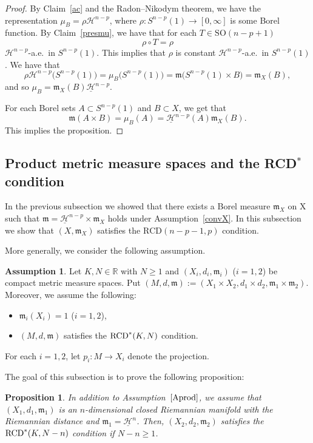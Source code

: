\documentclass[10pt,a4paper]{amsart}
\numberwithin{equation}{section}
\newtheorem{Prop}[Thm]{Proposition}
\theoremstyle{definition}
\newtheorem{Asu}[Thm]{Assumption}
\newcommand{\R}{\mathbb{R}}
\newcommand{\mf}{\mathfrak{m}}
\newcommand{\RCD}{{\rm RCD}^\ast}
\newcommand{\Ha}{\mathcal{H}}
\newcommand{\nHa}{\underline{\mathcal{H}}}
\begin{document}
\begin{proof}
By Claim~\ref{ac} and the Radon--Nikodym theorem, we have the representation $\mu_B=\rho \Ha^{n-p}$, where $\rho\colon S^{n-p}(1)\to [0,\infty]$ is some Borel function.
By Claim~\ref{presmu}, we have that for each $T\in \mathrm{SO}(n-p+1)$
\[
\rho\circ T=\rho
\]
$\Ha^{n-p}$-a.e.\ in $S^{n-p}(1)$.
This implies that $\rho$ is constant $\Ha^{n-p}$-a.e.\ in $S^{n-p}(1)$.
We have that
\[
\rho\Ha^{n-p}\big(S^{n-p}(1)\big)=\mu_B\big(S^{n-p}(1)\big)=\mf\big(S^{n-p}(1)\times B\big)=\mf_X(B),
\]
and so $\mu_B=\mf_X(B)\nHa^{n-p}$.

For each Borel sets $A\subset S^{n-p}(1)$ and $B\subset X$, we get that
\[
\mf(A\times B)=\mu_B(A)=\nHa^{n-p}(A)\mf_X(B).
\tag*{\qed}
\]
\renewcommand{\qed}{}
This implies the proposition.
\end{proof}


\subsection[Product metric measure spaces and the RCD* condition]{Product metric measure spaces and the RCD$\boldsymbol{^*}$ condition}
In the previous subsection we showed that there exists a Borel measure $\mf_X$ on X such that $\mf=\nHa^{n-p}\times \mf_X$ holds under Assumption~\ref{convX}.
In this subsection we show that $(X,\mf_X)$ satisfies the $\mathrm{RCD}(n-p-1,p)$ condition.

More generally, we consider the following assumption.
\begin{Asu}\label{Aprod}
Let $K, N\in \R$ with $N\geq 1$ and $(X_i,d_i,\mf_i)$ ($i=1,2$) be compact metric measure spaces.
Put $(M,d,\mf):=(X_1\times X_2,d_1\times d_2,\mf_1\times \mf_2)$.
Moreover, we assume the following:
\begin{itemize}\itemsep=0pt
\item $\mf_i(X_i)=1$ ($i=1,2$),
\item $(M,d,\mf)$ satisfies the $\RCD(K,N)$ condition.
\end{itemize}
For each $i=1,2$, let $p_i\colon M\to X_i$ denote the projection.
\end{Asu}

The goal of this subsection is to prove the following proposition:

\begin{Prop}\label{KN-n}
In addition to Assumption~$\ref{Aprod}$, we assume that $(X_1,d_1,\mf_1)$ is an $n$-dimen\-sio\-nal closed Riemannian manifold with the Riemannian distance and $\mf_1=\nHa^n$.
Then, \linebreak $(X_2,d_2,\mf_2)$ satisfies the $\RCD(K,N-n)$ condition if $N-n\geq 1$.
\end{Prop}
\end{document}
